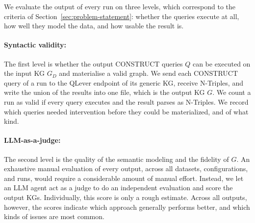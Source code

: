 We evaluate the output of every run on three levels, which correspond to the criteria of Section~\ref{sec:problem-statement}: whether the queries execute at all, how well they model the data, and how usable the result is.
 
\paragraph{Syntactic validity:}
The first level is whether the output CONSTRUCT queries \(Q\) can be executed on the input KG \(G_D\) and materialise a valid graph. We send each CONSTRUCT query of a run to the QLever endpoint of its generic KG, receive N-Triples, and write the union of the results into one file, which is the output KG \(G\). We count a run as valid if every query executes and the result parses as N-Triples. We record which queries needed intervention before they could be materialized, and of what kind.

\paragraph{LLM-as-a-judge:}
The second level is the quality of the semantic modeling and the fidelity of \(G\). An exhaustive manual evaluation of every output, across all datasets, configurations, and runs, would require a considerable amount of manual effort. Instead, we let an LLM agent act as a judge to do an independent evaluation and score the output KGs. Individually, this score is only a rough estimate. Across all outputs, however, the scores indicate which approach generally performs better, and which kinds of issues are most common.

